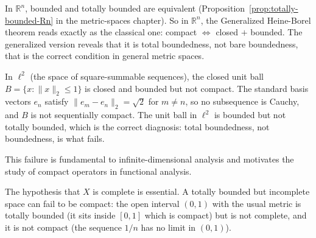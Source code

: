 \begin{remark*}
In $\mathbb{R}^n$, bounded and totally bounded are equivalent
(Proposition~\ref{prop:totally-bounded-Rn} in the metric-spaces chapter).
So in $\mathbb{R}^n$, the Generalized Heine-Borel theorem reads exactly as
the classical one: compact $\iff$ closed $+$ bounded.
The generalized version reveals that it is total boundedness, not bare
boundedness, that is the correct condition in general metric spaces.
\end{remark*}

\begin{remark*}
In $\ell^2$ (the space of square-summable sequences), the closed unit ball
$B = \{x : \|x\|_2 \le 1\}$ is closed and bounded but not compact.
The standard basis vectors $e_n$ satisfy $\|e_m - e_n\|_2 = \sqrt{2}$ for
$m \ne n$, so no subsequence is Cauchy, and $B$ is not sequentially compact.
The unit ball in $\ell^2$ is bounded but not totally bounded, which is the
correct diagnosis: total boundedness, not boundedness, is what fails.

This failure is fundamental to infinite-dimensional analysis and motivates
the study of compact operators in functional analysis.
\end{remark*}

\begin{remark*}
The hypothesis that $X$ is complete is essential.
A totally bounded but incomplete space can fail to be compact:
the open interval $(0,1)$ with the usual metric is totally bounded
(it sits inside $[0,1]$ which is compact) but is not complete,
and it is not compact (the sequence $1/n$ has no limit in $(0,1)$).
\end{remark*}
